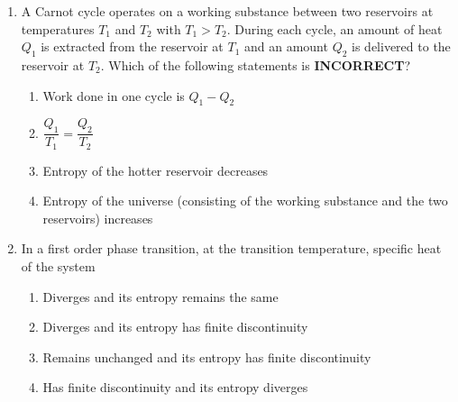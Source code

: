 \documentclass[journal,12pt,onecolumn]{IEEEtran}
\begin{document}
\begin{enumerate}
\hfill{}

\begin{multicols}{4}
\begin{enumerate}
    \item $i\hbar \dfrac{d}{dx}$
    \item $-i\hbar \dfrac{d}{dx}$
    \item $\dagger \dfrac{\partial}{\partial t}$
    \item $-\dfrac{\hbar^{2}}{2m} \dfrac{d^{2}}{dx^{2}}$
\end{enumerate}
\end{multicols}

\item A Carnot cycle operates on a working substance between two reservoirs at temperatures $T_{1}$ and $T_{2}$ with $T_{1} > T_{2}$. During each cycle, an amount of heat $Q_{1}$ is extracted from the reservoir at $T_{1}$ and an amount $Q_{2}$ is delivered to the reservoir at $T_{2}$. Which of the following statements is \textbf{INCORRECT}?

\hfill{}


\begin{enumerate}
    \item Work done in one cycle is $Q_{1} - Q_{2}$
    \item $\dfrac{Q_{1}}{T_{1}} = \dfrac{Q_{2}}{T_{2}}$
    \item Entropy of the hotter reservoir decreases
    \item Entropy of the universe (consisting of the working substance and the two reservoirs) increases
\end{enumerate}


\item In a first order phase transition, at the transition temperature, specific heat of the system

\hfill{}

\begin{enumerate}
    \item Diverges and its entropy remains the same
    \item Diverges and its entropy has finite discontinuity
    \item Remains unchanged and its entropy has finite discontinuity
    \item Has finite discontinuity and its entropy diverges
\end{enumerate}

\newpage


\end{enumerate}
\end{document}

